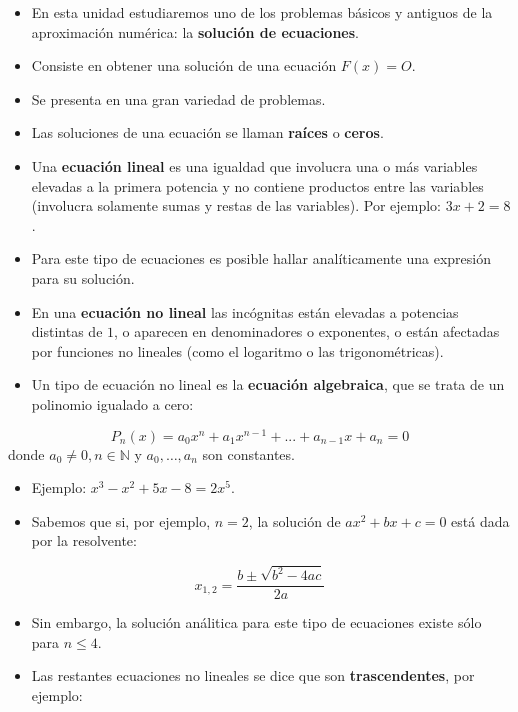 \documentclass[openany]{book}
\begin{document}
\begin{itemize}
\item
  En esta unidad estudiaremos uno de los problemas básicos y antiguos de la aproximación numérica: la \textbf{solución de ecuaciones}.
\item
  Consiste en obtener una solución de una ecuación \(F(x) = O\).
\item
  Se presenta en una gran variedad de problemas.
\item
  Las soluciones de una ecuación se llaman \textbf{raíces} o \textbf{ceros}.
\item
  Una \textbf{ecuación lineal} es una igualdad que involucra una o más variables elevadas a la primera potencia y no contiene productos entre las variables (involucra solamente sumas y restas de las variables). Por ejemplo: \(3x+2 = 8\).
\item
  Para este tipo de ecuaciones es posible hallar analíticamente una expresión para su solución.
\item
  En una \textbf{ecuación no lineal} las incógnitas están elevadas a potencias distintas de \(1\), o aparecen en denominadores o exponentes, o están afectadas por funciones no lineales (como el logaritmo o las trigonométricas).
\item
  Un tipo de ecuación no lineal es la \textbf{ecuación algebraica}, que se trata de un polinomio igualado a cero:
\end{itemize}

\[
P_n(x) = a_0 x^n + a_1 x^{n-1} + ... + a_{n-1} x + a_n = 0
\]
donde \(a_0 \ne 0, n \in \mathbb{N}\) y \(a_0, \dots, a_n\) son constantes.

\begin{itemize}
\item
  Ejemplo: \(x^3 - x^2 + 5x - 8 = 2x^5\).
\item
  Sabemos que si, por ejemplo, \(n = 2\), la solución de \(ax^2 + b x + c = 0\) está dada por la resolvente:
\end{itemize}

\[
x_{1,2} = \frac{b \pm \sqrt{b^2 - 4ac}}{2a}
\]

\begin{itemize}
\item
  Sin embargo, la solución análitica para este tipo de ecuaciones existe sólo para \(n \le 4\).
\item
  Las restantes ecuaciones no lineales se dice que son \textbf{trascendentes}, por ejemplo:
\end{itemize}
\end{document}

